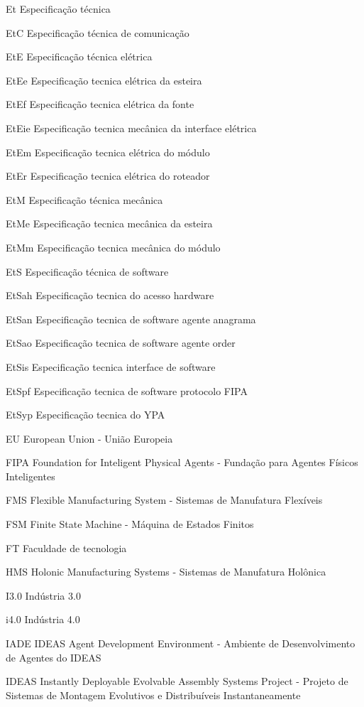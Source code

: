 \documentclass[
12pt,				%
openright,			%
oneside,			%
a4paper,			%
english,			%
brazil				%
]{abntex2}
\begin{document}
\begin{siglas}
\item[Et] Especificação técnica
\item[EtC] Especificação técnica de comunicação
\item[EtE] Especificação técnica elétrica
\item[EtEe] Especificação tecnica elétrica da esteira
\item[EtEf] Especificação tecnica elétrica da fonte
\item[EtEie] Especificação tecnica mecânica da interface elétrica
\item[EtEm] Especificação tecnica elétrica do módulo
\item[EtEr] Especificação tecnica elétrica do roteador
\item[EtM] Especificação técnica mecânica
\item[EtMe] Especificação tecnica mecânica da esteira
\item[EtMm] Especificação tecnica mecânica do módulo
\item[EtS] Especificação técnica de software
\item[EtSah] Especificação tecnica do acesso hardware
\item[EtSan] Especificação tecnica de software agente anagrama
\item[EtSao] Especificação tecnica de software agente order
\item[EtSis] Especificação tecnica interface de software
\item[EtSpf] Especificação tecnica de software protocolo FIPA
\item[EtSyp] Especificação tecnica do YPA
\item[EU] European Union - União Europeia
\item[FIPA] Foundation for Inteligent Physical Agents - Fundação para Agentes Físicos Inteligentes
\item[FMS] Flexible Manufacturing System - Sistemas de Manufatura Flexíveis
\item[FSM] Finite State Machine - Máquina de Estados Finitos
\item[FT] Faculdade de tecnologia
\item[HMS] Holonic Manufacturing Systems - Sistemas de Manufatura Holônica
\item[I3.0] Indústria 3.0
\item[i4.0] Indústria 4.0
\item[IADE] IDEAS Agent Development Environment - Ambiente de Desenvolvimento de Agentes do IDEAS
\item[IDEAS] Instantly Deployable Evolvable Assembly Systems Project - Projeto de Sistemas de Montagem Evolutivos e Distribuíveis Instantaneamente

\end{siglas}
\end{document}
